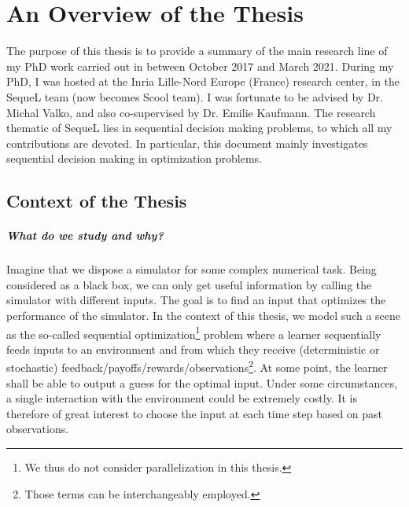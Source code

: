 \chapter{An Overview of the Thesis}\label{chap:intro}
	\minitoc
	\newpage





The purpose of this thesis is to provide a summary of the main research line of my PhD work carried out in between October 2017 and March 2021. During my PhD, I was hosted at the Inria Lille-Nord Europe (France) research center, in the SequeL team (now becomes Scool team). I was fortunate to be advised by Dr. Michal Valko, and also co-supervised by Dr. Emilie Kaufmann. The research thematic of SequeL lies in sequential decision making problems, to which all my contributions are devoted. In particular, this document mainly investigates sequential decision making in optimization problems.

\section{Context of the Thesis}\label{sec:intro.context}
	
\paragraph{What do we study and why?}

Imagine that we dispose a simulator for some complex numerical task. Being considered as a black box, we can only get useful information by calling the simulator with different inputs. The goal is to find an input that optimizes the performance of the simulator. In the context of this thesis, we model such a scene as the so-called \gls{sequential optimization}\footnote{We thus do not consider parallelization in this thesis.} problem where a learner sequentially feeds inputs to an environment and from which they receive (deterministic or stochastic) feedback/payoffs/rewards/observations\footnote{Those terms can be interchangeably employed.}. At some point, the learner shall be able to output a guess for the optimal input. Under some circumstances, a single interaction with the environment could be extremely costly. It is therefore of great interest to choose the input at each time step based on past observations.

